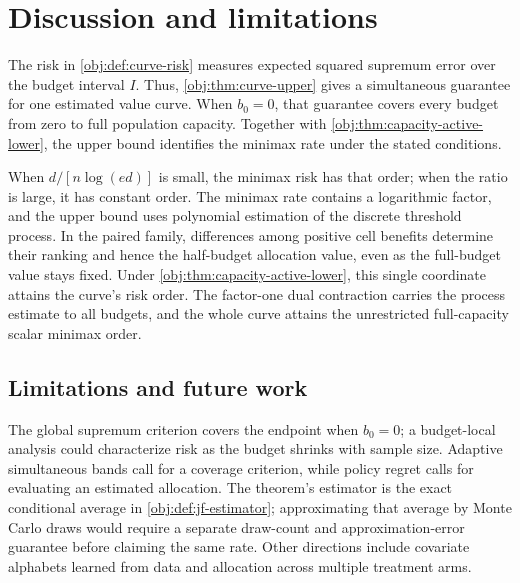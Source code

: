 \section{Discussion and limitations}

The risk in \cref{obj:def:curve-risk} measures expected squared supremum error over the budget interval \(I\). Thus, \cref{obj:thm:curve-upper} gives a simultaneous guarantee for one estimated value curve. When \(b_0=0\), that guarantee covers every budget from zero to full population capacity. Together with \cref{obj:thm:capacity-active-lower}, the upper bound identifies the minimax rate under the stated conditions.

When \(d/[n\log(ed)]\) is small, the minimax risk has that order; when the ratio is large, it has constant order. The minimax rate contains a logarithmic factor, and the upper bound uses polynomial estimation of the discrete threshold process. In the paired family, differences among positive cell benefits determine their ranking and hence the half-budget allocation value, even as the full-budget value stays fixed. Under \cref{obj:thm:capacity-active-lower}, this single coordinate attains the curve’s risk order. The factor-one dual contraction carries the process estimate to all budgets, and the whole curve attains the unrestricted full-capacity scalar minimax order.

\subsection{Limitations and future work}

The global supremum criterion covers the endpoint when \(b_0=0\); a budget-local analysis could characterize risk as the budget shrinks with sample size. Adaptive simultaneous bands call for a coverage criterion, while policy regret calls for evaluating an estimated allocation. The theorem's estimator is the exact conditional average in \cref{obj:def:jf-estimator}; approximating that average by Monte Carlo draws would require a separate draw-count and approximation-error guarantee before claiming the same rate. Other directions include covariate alphabets learned from data and allocation across multiple treatment arms.
